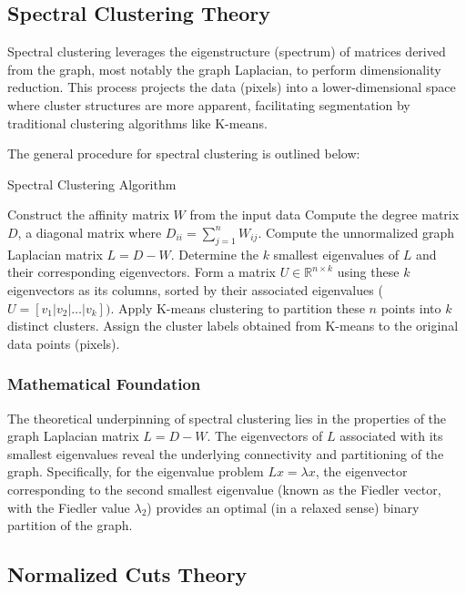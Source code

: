 \documentclass[12pt,a4paper]{article}
\begin{document}
\subsection{Spectral Clustering Theory}
\label{subsec:spectral_theory}

Spectral clustering leverages the eigenstructure (spectrum) of matrices derived from the graph, most notably the graph Laplacian, to perform dimensionality reduction. This process projects the data (pixels) into a lower-dimensional space where cluster structures are more apparent, facilitating segmentation by traditional clustering algorithms like K-means.

The general procedure for spectral clustering is outlined below:
\begin{algorithm}[H]
\caption{Spectral Clustering Algorithm}
\begin{algorithmic}[1]
\State Construct the affinity matrix $W$ from the input data 
\State Compute the degree matrix $D$, a diagonal matrix where $D_{ii} = \sum_{j=1}^{n} W_{ij}$.
\State Compute the unnormalized graph Laplacian matrix $L = D - W$.
\State Determine the $k$ smallest eigenvalues of $L$ and their corresponding eigenvectors.
\State Form a matrix $U \in \mathbb{R}^{n \times k}$ using these $k$ eigenvectors as its columns, sorted by their associated eigenvalues ($U = [v_1 | v_2 | \ldots | v_k])$.
\State Apply K-means clustering to partition these $n$ points into $k$ distinct clusters.
\State Assign the cluster labels obtained from K-means to the original data points (pixels).
\end{algorithmic}
\end{algorithm}

\subsubsection*{Mathematical Foundation}
The theoretical underpinning of spectral clustering lies in the properties of the graph Laplacian matrix $L = D - W$. The eigenvectors of $L$ associated with its smallest eigenvalues reveal the underlying connectivity and partitioning of the graph. Specifically, for the eigenvalue problem $Lx = \lambda x$, the eigenvector corresponding to the second smallest eigenvalue (known as the Fiedler vector, with the Fiedler value $\lambda_2$) provides an optimal (in a relaxed sense) binary partition of the graph.

\subsection{Normalized Cuts Theory}
\label{subsec:ncuts_theory}
\end{document}
